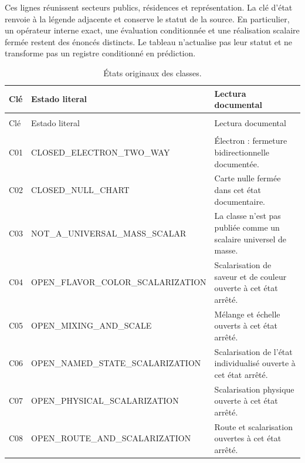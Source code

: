 Ces lignes réunissent secteurs publics, résidences et représentation. La clé
d'état renvoie à la légende adjacente et conserve le statut de la source.
En particulier, un opérateur interne exact, une évaluation conditionnée et une
réalisation scalaire fermée restent des énoncés distincts. Le tableau
n'actualise pas leur statut et ne transforme pas un registre conditionné en prédiction.

\begingroup
\setlength{\tabcolsep}{4pt}
\setlength{\extrarowheight}{4pt}
\renewcommand{\arraystretch}{1.13}
\begin{longtable}{@{}>{\raggedright\arraybackslash}p{}>{\raggedright\arraybackslash}p{}>{\raggedright\arraybackslash}p{}@{}}
\caption{États originaux des classes.}\label{vi:tab:vi-estados-clases}\\
\toprule
Clé & Estado literal & Lectura documental \\
\midrule
\endfirsthead
\multicolumn{3}{l}{\textit{Suite}}\\
\toprule
Clé & Estado literal & Lectura documental \\
\midrule
\endhead
\midrule
\multicolumn{3}{r}{Suite à la page suivante}\\
\endfoot
\bottomrule
\endlastfoot
C01 & CLOSED\_\allowbreak{}ELECTRON\_\allowbreak{}TWO\_\allowbreak{}WAY & Électron : fermeture bidirectionnelle documentée. \\
C02 & CLOSED\_\allowbreak{}NULL\_\allowbreak{}CHART & Carte nulle fermée dans cet état documentaire. \\
C03 & NOT\_\allowbreak{}A\_\allowbreak{}UNIVERSAL\_\allowbreak{}MASS\_\allowbreak{}SCALAR & La classe n'est pas publiée comme un scalaire universel de masse. \\
C04 & OPEN\_\allowbreak{}FLAVOR\_\allowbreak{}COLOR\_\allowbreak{}SCALARIZATION & Scalarisation de saveur et de couleur ouverte à cet état arrêté. \\
C05 & OPEN\_\allowbreak{}MIXING\_\allowbreak{}AND\_\allowbreak{}SCALE & Mélange et échelle ouverts à cet état arrêté. \\
C06 & OPEN\_\allowbreak{}NAMED\_\allowbreak{}STATE\_\allowbreak{}SCALARIZATION & Scalarisation de l’état individualisé ouverte à cet état arrêté. \\
C07 & OPEN\_\allowbreak{}PHYSICAL\_\allowbreak{}SCALARIZATION & Scalarisation physique ouverte à cet état arrêté. \\
C08 & OPEN\_\allowbreak{}ROUTE\_\allowbreak{}AND\_\allowbreak{}SCALARIZATION & Route et scalarisation ouvertes à cet état arrêté. \\
\end{longtable}
\endgroup


